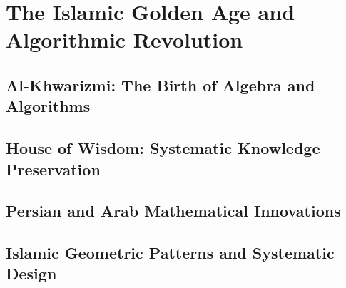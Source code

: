 
\chapter{The Islamic Golden Age and Algorithmic Revolution}

\section{Al-Khwarizmi: The Birth of Algebra and Algorithms}

\section{House of Wisdom: Systematic Knowledge Preservation}

\section{Persian and Arab Mathematical Innovations}

\section{Islamic Geometric Patterns and Systematic Design}
